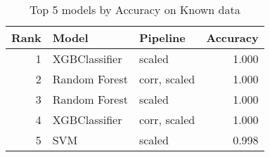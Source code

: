 \begin{table}[!htb]
\caption{Top 5 models by Accuracy on Known data}
\label{table-top-5-accuracy-known}
\centering
\begin{tabular}{rllr}
\toprule
Rank & Model & Pipeline & Accuracy \\
\midrule
1 & XGBClassifier & scaled & 1.000 \\
2 & Random Forest & corr, scaled & 1.000 \\
3 & Random Forest & scaled & 1.000 \\
4 & XGBClassifier & corr, scaled & 1.000 \\
5 & SVM & scaled & 0.998 \\
\bottomrule
\end{tabular}
\end{table}
